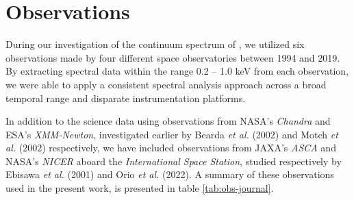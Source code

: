 \section{Observations}
	During our investigation of the continuum spectrum of \source, we utilized six observations made by four different space observatories between 1994 and 2019.
	By extracting spectral data within the range 0.2 -- 1.0 keV from each observation, we were able to apply a consistent spectral analysis approach across a broad temporal range and disparate instrumentation platforms.
		
	In addition to the science data using observations from NASA's \textit{Chandra} and ESA's \textit{XMM-Newton}, investigated earlier by Bearda \textit{et al.} (2002) \cite{beardaChandra2002AA} and Motch \textit{et al.} (2002) \cite{motchXmmNewton2002AA} respectively, we have included observations from JAXA's \textit{ASCA} \cite{ebisawaAsca2001ApJ} and NASA's \textit{NICER} \cite{orioNicer2022ApJ} aboard the \textit{International Space Station}, studied respectively by Ebisawa \textit{et al.} (2001) and Orio \textit{et al.} (2022). A summary of these observations used in the present work, %
	is presented in table \ref{tab:obs-journal}. %
